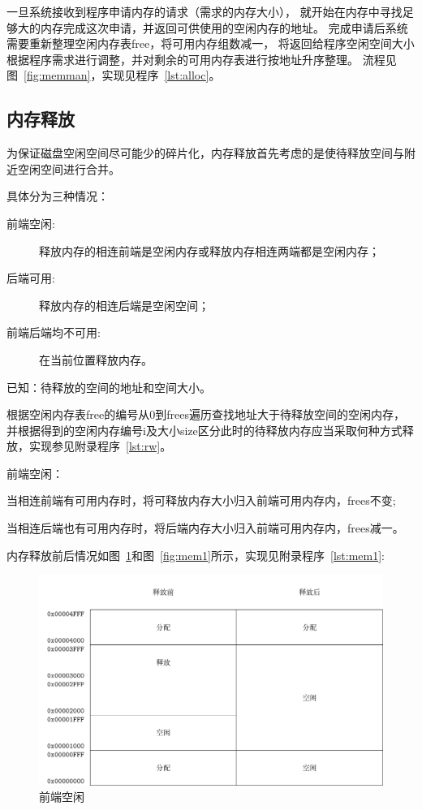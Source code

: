 一旦系统接收到程序申请内存的请求（需求的内存大小），
就开始在内存中寻找足够大的内存完成这次申请，并返回可供使用的空闲内存的地址。
完成申请后系统需要重新整理空闲内存表free，将可用内存组数减一，
将返回给程序空闲空间大小根据程序需求进行调整，并对剩余的可用内存表进行按地址升序整理。
流程见图~\ref{fig:memman}，实现见程序~\ref{lst:alloc}。


\subsection{内存释放}

为保证磁盘空闲空间尽可能少的碎片化，内存释放首先考虑的是使待释放空间与附近空闲空间进行合并\cite{bryant2003computer}。

具体分为三种情况：

\begin{description}
\item[前端空闲:]释放内存的相连前端是空闲内存或释放内存相连两端都是空闲内存；
\item[后端可用:]释放内存的相连后端是空闲空间；
\item[前端后端均不可用:]在当前位置释放内存。
\end{description}

已知：待释放的空间的地址和空间大小。

根据空闲内存表free的编号从0到frees遍历查找地址大于待释放空间的空闲内存，
并根据得到的空闲内存编号i及大小size区分此时的待释放内存应当采取何种方式释放，实现参见附录程序~\ref{lst:rw}。

\newpage
前端空闲：

当相连前端有可用内存时，将可释放内存大小归入前端可用内存内，frees不变;

当相连后端也有可用内存时，将后端内存大小归入前端可用内存内，frees减一。

内存释放前后情况如图~\ref{fig:mem0}和图~\ref{fig:mem1}所示，实现见附录程序~\ref{lst:mem1}: 

\begin{figure}[h]
  \centering
  \includegraphics[width=.7\textwidth]{../Fig/mem0.pdf}
  \caption{前端空闲}
  \label{fig:mem0}
\end{figure}


